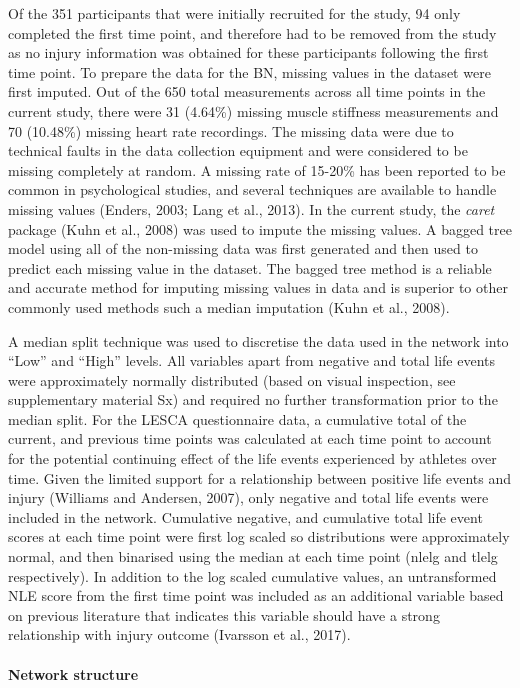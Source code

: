 \documentclass[
  english,
  man]{apa6}
\let\oldparagraph\paragraph
\renewcommand{\paragraph}[1]{\oldparagraph{#1}\mbox{}}
\begin{document}
Of the 351 participants that were initially recruited for the study, 94 only completed the first time point, and therefore had to be removed from the study as no injury information was obtained for these participants following the first time point.
To prepare the data for the BN, missing values in the dataset were first imputed.
Out of the 650 total measurements across all time points in the current study, there were 31 (4.64\%) missing muscle stiffness measurements and 70 (10.48\%) missing heart rate recordings. The missing data were due to technical faults in the data collection equipment and were considered to be missing completely at random.
A missing rate of 15-20\% has been reported to be common in psychological studies, and several techniques are available to handle missing values (Enders, 2003; Lang et al., 2013).
In the current study, the \emph{caret} package (Kuhn et al., 2008) was used to impute the missing values.
A bagged tree model using all of the non-missing data was first generated and then used to predict each missing value in the dataset.
The bagged tree method is a reliable and accurate method for imputing missing values in data and is superior to other commonly used methods such a median imputation (Kuhn et al., 2008).

A median split technique was used to discretise the data used in the network into ``Low'' and ``High'' levels.
All variables apart from negative and total life events were approximately normally distributed (based on visual inspection, see supplementary material Sx) and required no further transformation prior to the median split.
For the LESCA questionnaire data, a cumulative total of the current, and previous time points was calculated at each time point to account for the potential continuing effect of the life events experienced by athletes over time.
Given the limited support for a relationship between positive life events and injury (Williams and Andersen, 2007), only negative and total life events were included in the network.
Cumulative negative, and cumulative total life event scores at each time point were first log scaled so distributions were approximately normal, and then binarised using the median at each time point (nlelg and tlelg respectively).
In addition to the log scaled cumulative values, an untransformed NLE score from the first time point was included as an additional variable based on previous literature that indicates this variable should have a strong relationship with injury outcome (Ivarsson et al., 2017).

\hypertarget{network-structure}{%
\paragraph{Network structure}\label{network-structure}}
\end{document}
